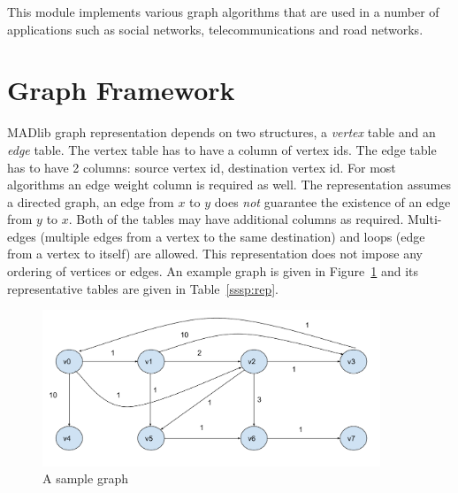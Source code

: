 This module implements various graph algorithms that are used in a number of
applications such as social networks, telecommunications and road networks.

\section{Graph Framework} \label{sec:graph:fw}

MADlib graph representation depends on two structures, a \emph{vertex} table
and an \emph{edge} table. The vertex table has to have a column of vertex ids.
The edge table has to have 2 columns: source vertex id, destination vertex id.
For most algorithms an edge weight column is required as well. The
representation assumes a directed graph, an edge from $x$ to $y$ does
\emph{not} guarantee the existence of an edge from $y$ to $x$. Both of the
tables may have additional columns as required. Multi-edges (multiple edges
from a vertex to the same destination) and loops (edge from a vertex to
itself) are allowed. This representation does not impose any ordering of
vertices or edges. An example graph is given in Figure~\ref{sssp:example} and
its representative tables are given in Table~\ref{sssp:rep}.

\begin{figure}[h]
	\centering
	\includegraphics[width=0.9\textwidth]{figures/graph_example.pdf}
\caption{A sample graph}
\label{sssp:example}
\end{figure}

